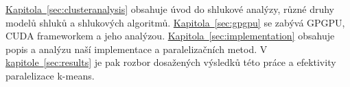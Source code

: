 



\hyperref[sec:clusteranalysis]{Kapitola~\ref*{sec:clusteranalysis}} obsahuje úvod do shlukové analýzy, různé druhy modelů shluků a shlukových algoritmů. \hyperref[sec:gpgpu]{Kapitola~\ref*{sec:gpgpu}} se zabývá GPGPU, CUDA frameworkem a jeho analýzou. \hyperref[sec:implementation]{Kapitola~\ref*{sec:implementation}} obsahuje popis a analýzu naší implementace a paralelizačních metod. V \hyperref[sec:results]{kapitole~\ref*{sec:results}} je pak rozbor dosažených výsledků této práce a efektivity paralelizace k-means.

